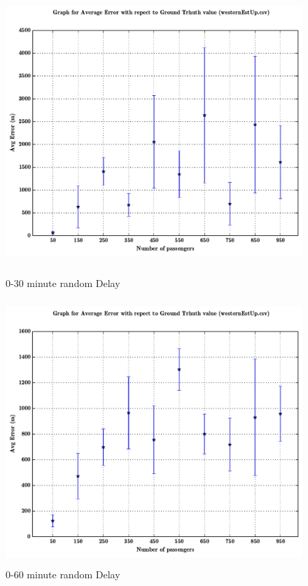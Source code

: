 \documentclass[a4paper,12pt]{report}
\begin{document}
\begin{figure}[h!]

\centering
\includegraphics[height=10cm,width=17cm]{06_30minDelay.pdf}
\caption{0-30 minute random Delay}

\centering
\includegraphics[height=10cm,width=17cm]{07_60minDelay.pdf}
\caption{0-60 minute random Delay}

\end{figure}
\end{document}
